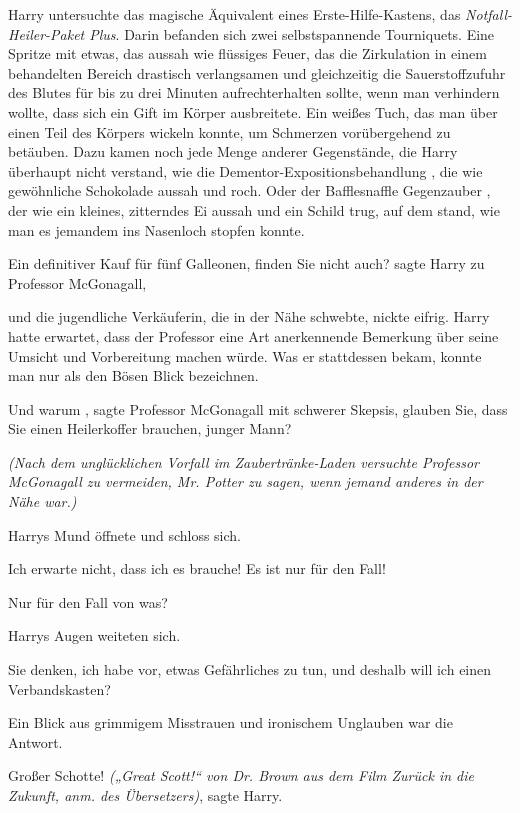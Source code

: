 Harry untersuchte das magische Äquivalent eines Erste-Hilfe-Kastens, das
\emph{Notfall-Heiler-Paket Plus}. Darin befanden sich zwei selbstspannende
Tourniquets. Eine Spritze mit etwas, das aussah wie flüssiges Feuer, das die
Zirkulation in einem behandelten Bereich drastisch verlangsamen und
gleichzeitig die Sauerstoffzufuhr des Blutes für bis zu drei Minuten
aufrechterhalten sollte, wenn man verhindern wollte, dass sich ein Gift im
Körper ausbreitete. Ein weißes Tuch, das man über einen Teil des Körpers
wickeln konnte, um Schmerzen vorübergehend zu betäuben. Dazu kamen noch jede
Menge anderer Gegenstände, die Harry überhaupt nicht verstand, wie die \glqq
Dementor-Expositionsbehandlung\grqq{} , die wie gewöhnliche Schokolade
aussah und roch. Oder der \glqq Bafflesnaffle Gegenzauber\grqq{} , der wie
ein kleines, zitterndes Ei aussah und ein Schild trug, auf dem stand, wie
man es jemandem ins Nasenloch stopfen konnte.

\glqq Ein definitiver Kauf für fünf Galleonen, finden Sie nicht auch?\grqq{}
sagte Harry zu Professor McGonagall,

und die jugendliche Verkäuferin, die in der Nähe schwebte, nickte eifrig. Harry
hatte erwartet, dass der Professor eine Art anerkennende Bemerkung über
seine Umsicht und Vorbereitung machen würde. Was er stattdessen bekam,
konnte man nur als den Bösen Blick bezeichnen.

\glqq Und warum\grqq{} , sagte Professor McGonagall mit schwerer Skepsis, \glqq
glauben Sie, dass Sie einen Heilerkoffer brauchen, junger Mann?\grqq{}

\emph{(Nach dem unglücklichen Vorfall im Zaubertränke-Laden versuchte Professor
McGonagall zu vermeiden, \glqq Mr. Potter\grqq{} zu sagen, wenn jemand anderes
in der Nähe war.) }

Harrys Mund öffnete und schloss sich.

\glqq Ich erwarte nicht, dass ich es brauche! Es ist nur für den Fall!\grqq{}

\glqq Nur für den Fall von was?\grqq{}

Harrys Augen weiteten sich.

\glqq Sie denken, ich habe vor, etwas Gefährliches zu tun, und deshalb will ich
einen Verbandskasten?\grqq{}

Ein Blick aus grimmigem Misstrauen und ironischem Unglauben war die Antwort.

\glqq Großer Schotte!\grqq{} \emph{(„Great Scott!“ von Dr. Brown aus dem Film
Zurück in die Zukunft, anm. des Übersetzers)}, sagte Harry.

